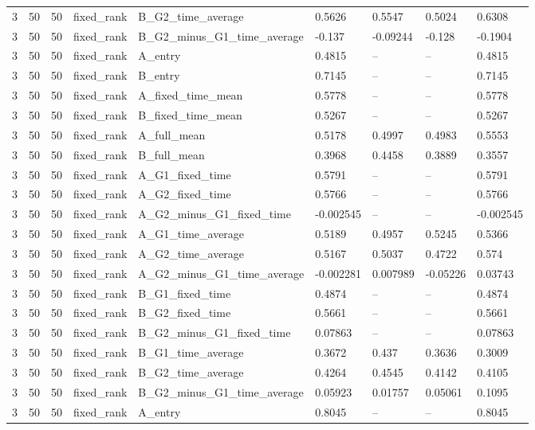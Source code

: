 \begin{longtable}{lllllllll}
3 & 50 & 50 & fixed\_rank & B\_G2\_time\_average & 0.5626 & 0.5547 & 0.5024 & 0.6308 \\
3 & 50 & 50 & fixed\_rank & B\_G2\_minus\_G1\_time\_average & -0.137 & -0.09244 & -0.128 & -0.1904 \\
3 & 50 & 50 & fixed\_rank & A\_entry & 0.4815 & -- & -- & 0.4815 \\
3 & 50 & 50 & fixed\_rank & B\_entry & 0.7145 & -- & -- & 0.7145 \\
3 & 50 & 50 & fixed\_rank & A\_fixed\_time\_mean & 0.5778 & -- & -- & 0.5778 \\
3 & 50 & 50 & fixed\_rank & B\_fixed\_time\_mean & 0.5267 & -- & -- & 0.5267 \\
3 & 50 & 50 & fixed\_rank & A\_full\_mean & 0.5178 & 0.4997 & 0.4983 & 0.5553 \\
3 & 50 & 50 & fixed\_rank & B\_full\_mean & 0.3968 & 0.4458 & 0.3889 & 0.3557 \\
3 & 50 & 50 & fixed\_rank & A\_G1\_fixed\_time & 0.5791 & -- & -- & 0.5791 \\
3 & 50 & 50 & fixed\_rank & A\_G2\_fixed\_time & 0.5766 & -- & -- & 0.5766 \\
3 & 50 & 50 & fixed\_rank & A\_G2\_minus\_G1\_fixed\_time & -0.002545 & -- & -- & -0.002545 \\
3 & 50 & 50 & fixed\_rank & A\_G1\_time\_average & 0.5189 & 0.4957 & 0.5245 & 0.5366 \\
3 & 50 & 50 & fixed\_rank & A\_G2\_time\_average & 0.5167 & 0.5037 & 0.4722 & 0.574 \\
3 & 50 & 50 & fixed\_rank & A\_G2\_minus\_G1\_time\_average & -0.002281 & 0.007989 & -0.05226 & 0.03743 \\
3 & 50 & 50 & fixed\_rank & B\_G1\_fixed\_time & 0.4874 & -- & -- & 0.4874 \\
3 & 50 & 50 & fixed\_rank & B\_G2\_fixed\_time & 0.5661 & -- & -- & 0.5661 \\
3 & 50 & 50 & fixed\_rank & B\_G2\_minus\_G1\_fixed\_time & 0.07863 & -- & -- & 0.07863 \\
3 & 50 & 50 & fixed\_rank & B\_G1\_time\_average & 0.3672 & 0.437 & 0.3636 & 0.3009 \\
3 & 50 & 50 & fixed\_rank & B\_G2\_time\_average & 0.4264 & 0.4545 & 0.4142 & 0.4105 \\
3 & 50 & 50 & fixed\_rank & B\_G2\_minus\_G1\_time\_average & 0.05923 & 0.01757 & 0.05061 & 0.1095 \\
3 & 50 & 50 & fixed\_rank & A\_entry & 0.8045 & -- & -- & 0.8045 \\

\end{longtable}
